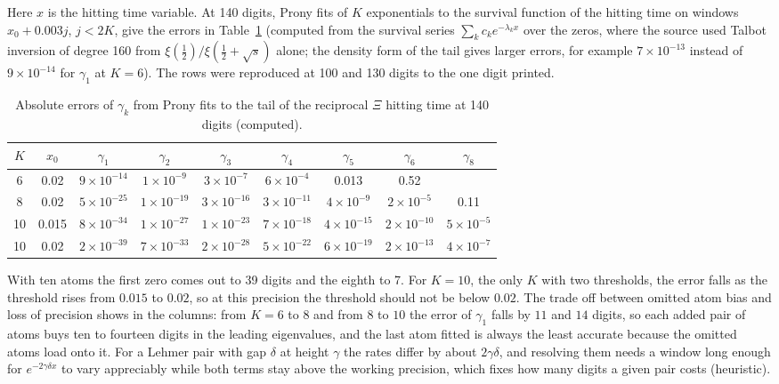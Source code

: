 Here $x$ is the hitting time variable. At 140 digits, Prony fits of $K$ exponentials to the survival function of the hitting time on windows $x_0+0.003j$, $j<2K$, give the errors in Table~\ref{ev:tab:prony2} (computed from the survival series $\sum_kc_ke^{-\lambda_kx}$ over the zeros, where the source used Talbot inversion of degree 160 from $\xi(\frac12)/\xi(\frac12+\sqrt s)$ alone; the density form of the tail gives larger errors, for example $7\times10^{-13}$ instead of $9\times10^{-14}$ for $\gamma_1$ at $K=6$). The rows were reproduced at 100 and 130 digits to the one digit printed.

\begin{table}[h]\centering\scriptsize\setlength{\tabcolsep}{2.5pt}
\begin{tabular}{ccccccccc}
\toprule
$K$ & $x_0$ & $\gamma_1$ & $\gamma_2$ & $\gamma_3$ & $\gamma_4$ & $\gamma_5$ & $\gamma_6$ & $\gamma_8$\\
\midrule
6 & 0.02 & $9\times10^{-14}$ & $1\times10^{-9}$ & $3\times10^{-7}$ & $6\times10^{-4}$ & 0.013 & 0.52 & \\
8 & 0.02 & $5\times10^{-25}$ & $1\times10^{-19}$ & $3\times10^{-16}$ & $3\times10^{-11}$ & $4\times10^{-9}$ & $2\times10^{-5}$ & 0.11\\
10 & 0.015 & $8\times10^{-34}$ & $1\times10^{-27}$ & $1\times10^{-23}$ & $7\times10^{-18}$ & $4\times10^{-15}$ & $2\times10^{-10}$ & $5\times10^{-5}$\\
10 & 0.02 & $2\times10^{-39}$ & $7\times10^{-33}$ & $2\times10^{-28}$ & $5\times10^{-22}$ & $6\times10^{-19}$ & $2\times10^{-13}$ & $4\times10^{-7}$\\
\bottomrule
\end{tabular}
\caption{Absolute errors of $\gamma_k$ from Prony fits to the tail of the reciprocal $\Xi$ hitting time at 140 digits (computed).}\label{ev:tab:prony2}
\end{table}

With ten atoms the first zero comes out to 39 digits and the eighth to 7. For $K=10$, the only $K$ with two thresholds, the error falls as the threshold rises from $0.015$ to $0.02$, so at this precision the threshold should not be below $0.02$. The trade off between omitted atom bias and loss of precision shows in the columns: from $K=6$ to $8$ and from $8$ to $10$ the error of $\gamma_1$ falls by $11$ and $14$ digits, so each added pair of atoms buys ten to fourteen digits in the leading eigenvalues, and the last atom fitted is always the least accurate because the omitted atoms load onto it. For a Lehmer pair with gap $\delta$ at height $\gamma$ the rates differ by about $2\gamma\delta$, and resolving them needs a window long enough for $e^{-2\gamma\delta x}$ to vary appreciably while both terms stay above the working precision, which fixes how many digits a given pair costs (heuristic).
